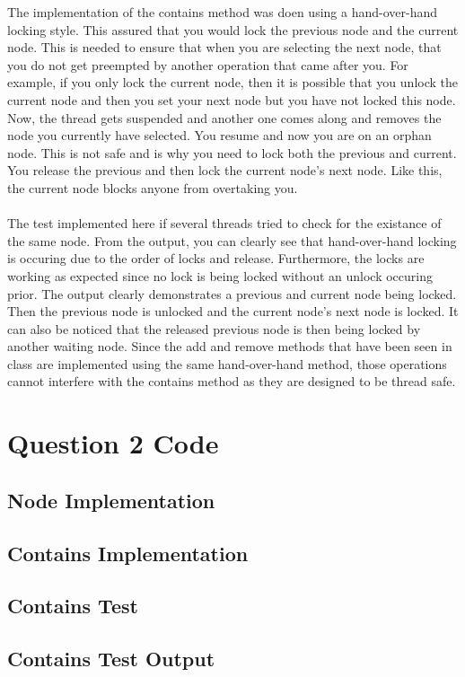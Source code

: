 \documentclass[11pt]{article}
\begin{document}
The implementation of the contains method was doen using a hand-over-hand locking style. This assured that you would lock the previous node 
and the current node. This is needed to ensure that when you are selecting the next node, that you do not get preempted by another operation 
that came after you. For example, if you only lock the current node, then it is possible that you unlock the current node and then you set your 
next node but you have not locked this node. Now, the thread gets suspended and another one comes along and removes the node you currently have 
selected. You resume and now you are on an orphan node. This is not safe and is why you need to lock both the previous and current. You release 
the previous and then lock the current node's next node. Like this, the current node blocks anyone from overtaking you.
\\\\
The test implemented here if several threads tried to check for the existance of the same node. From the output, you can clearly see that 
hand-over-hand locking is occuring due to the order of locks and release. Furthermore, the locks are working as expected since no lock 
is being locked without an unlock occuring prior. The output clearly demonstrates a previous and current node being locked. Then the 
previous node is unlocked and the current node's next node is locked. It can also be noticed that the released previous node is then 
being locked by another waiting node. Since the add and remove methods that have been seen in class are implemented using the same 
hand-over-hand method, those operations cannot interfere with the contains method as they are designed to be thread safe.


\appendix
\section{Question 2 Code}
\subsection{Node Implementation}

\subsection{Contains Implementation}

\subsection{Contains Test}

\subsection{Contains Test Output}

\end{document}
